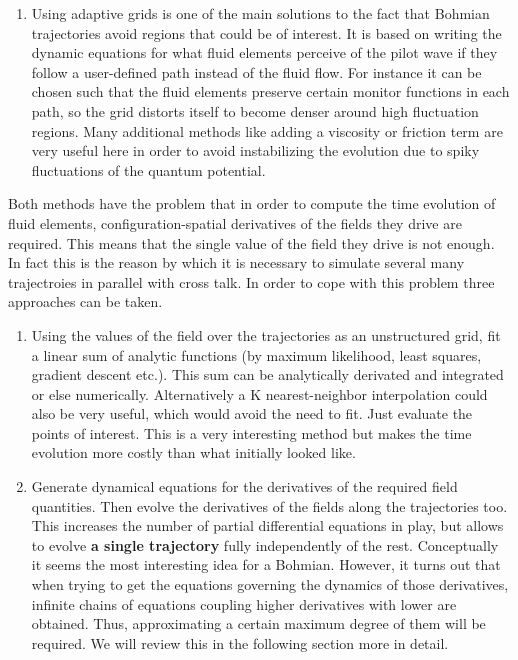 \documentclass[11pt, a4paper]{article} %
\begin{document}
\begin{enumerate}
\begin{enumerate}
\item Using adaptive grids is one of the main solutions to the fact that Bohmian trajectories avoid regions that could be of interest. It is based on writing the dynamic equations for what fluid elements perceive of the pilot wave if they follow a user-defined path instead of the fluid flow. For instance it can be chosen such that the fluid elements preserve certain monitor functions in each path, so the grid distorts itself to become denser around high fluctuation regions. Many additional methods like adding a viscosity or friction term are very useful here in order to avoid instabilizing the evolution due to spiky fluctuations of the quantum potential.
\end{enumerate}

Both methods have the problem that in order to compute the time evolution of fluid elements, configuration-spatial derivatives of the fields they drive are required. This means that the single value of the field they drive is not enough. In fact this is the reason by which it is necessary to simulate several many trajectroies in parallel with cross talk. In order to cope with this problem three approaches can be taken.

\begin{enumerate}
\item Using the values of the field over the trajectories as an unstructured grid, fit a linear sum of analytic functions (by maximum likelihood, least squares, gradient descent etc.). This sum can be analytically derivated and integrated or else numerically. Alternatively a K nearest-neighbor interpolation could also be very useful, which would avoid the need to fit. Just evaluate the points of interest. This is a very interesting method but makes the time evolution more costly than what initially looked like.

\item Generate dynamical equations for the derivatives of the required field quantities. Then evolve the derivatives of the fields along the trajectories too. This increases the number of partial differential equations in play, but allows to evolve {\bf a single trajectory} fully independently of the rest. Conceptually it seems the most interesting idea for a Bohmian. However, it turns out that when trying to get the equations governing the dynamics of those derivatives, infinite chains of equations coupling higher derivatives with lower are obtained. Thus, approximating a certain maximum degree of them will be required. We will review this in the following section more in detail.


\end{enumerate}
\end{enumerate}
\end{document}
